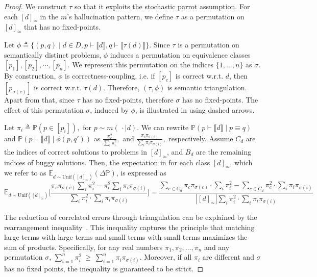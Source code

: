 \documentclass[acmsmall,screen,nonacm]{acmart}
\begin{document}
\begin{proof}

We construct $\tau$ so that it exploits the stochastic parrot assumption. For each $[d]_\simeq$ in the $m$'s hallucination pattern, we define $\tau$ as a permutation on $[d]_\simeq$ that has no fixed-points.

Let $\phi \triangleq \{ (p, q) \mid d\in D, p \vdash \llbracket d \rrbracket, q \vdash \llbracket \tau(d) \rrbracket \}.$ Since $\tau$ is a permutation on semantically distinct problems, $\phi$ induces a permutation on equivalence classes $[p_1], [p_2], \cdots, [p_n]$. We represent this permutation on the indices $\{1, ..., n\}$ as $\sigma$. By construction, $\phi$ is correctness-coupling, i.e. if $[p_c]$ is correct w.r.t. $d$, then $[p_{\sigma(c)}]$ is correct w.r.t. $\tau(d)$. Therefore, $(\tau, \phi)$ is semantic triangulation. Apart from that, since $\tau$ has no fixed-points, therefore $\sigma$ has no fixed-points. The effect of this permutation $\sigma$, induced by $\phi$, is illustrated in  using dashed arrows.

Let $\pi_i \triangleq \mathds{P}(p \in [p_i]),$ for $p \sim m(\,\cdot \mid d).$ We can rewrite $\mathds{P}(p \vdash \llbracket d \rrbracket \mid p \equiv q)$ and $\mathds{P}(p \vdash \llbracket d \rrbracket \mid \phi(p, q'))$ as $\frac{\pi_c^2}{\sum\limits_{i}\pi_i^2},$ and $\frac{\pi_c \pi_{\sigma(c)}}{\sum\limits_{i}\pi_i \pi_{\sigma(i)}},$ respectively. Assume $C_d$ are the indices of correct solutions to problems in $[d]_\simeq$, and $B_d$ are the remaining indices of buggy solutions. Then, the expectation in  for each class $[d]_\simeq$, which we refer to as $\mathds{E}_{d\sim\mathrm{Unif}([d]_\simeq)}(\Delta \mathds{P})$, is expressed as
\begin{equation}\label{eq:delta_elaborated}
\mathds{E}_{d\sim\mathrm{Unif}([d]_\simeq)} \Biggl[ \frac{\pi_c \pi_{\sigma(c)}\sum\limits_{i}\pi_i^2 - \pi_c^2 \sum\limits_{i}\pi_i \pi_{\sigma(i)}}{\sum\limits_{i}\pi_i^2\cdot\sum\limits_{i}\pi_i \pi_{\sigma(i)}} \Biggr] = \frac{\sum\limits_{c\in C_d} \pi_c \pi_{\sigma(c)}\cdot\sum\limits_{i}\pi_i^2 - \sum\limits_{c\in C_d} \pi_c^2 \cdot \sum\limits_{i}\pi_i \pi_{\sigma(i)}}{| [d]_\simeq | \sum\limits_{i}\pi_i^2\cdot\sum\limits_{i}\pi_i \pi_{\sigma(i)}}
\end{equation}

The reduction of correlated errors through triangulation can be explained by the rearrangement inequality~\cite{hardy1952inequalities}. This inequality captures the principle that matching large terms with large terms and small terms with small terms maximizes the sum of products. Specifically, for any real numbers $\pi_1, \pi_2, \dots, \pi_n$ and any permutation $\sigma$, $\sum_{i=1}^n \pi_i^2 \ \ge\ \sum_{i=1}^n \pi_i \pi_{\sigma(i)}$. Moreover, if all $\pi_i$ are different and $\sigma$ has no fixed points, the inequality is guaranteed to be strict.


\end{proof}
\end{document}
